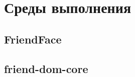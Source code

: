 \documentclass[../index.tex]{subfiles}
\begin{document}
\section{Среды выполнения}

\subsection{FriendFace}

\subsection{friend-dom-core}
\end{document}
